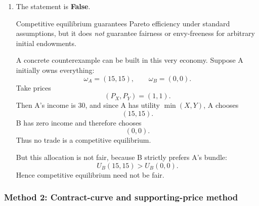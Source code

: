 \documentclass[12pt]{article}
\begin{document}
\begin{enumerate}[label=(\alph*)]
    At A's bundle \((7,7)\), A is exactly at the kink of the Leontief indifference curve \(X_A=Y_A\), so this same price ratio can support A's optimum. Therefore there exists a common supporting price vector, and hence \((7,7)\) is Pareto efficient.

    To produce \((7,7)\) as a competitive equilibrium after trade, choose an initial endowment for A that is different from \((7,7)\) but lies on the same budget line through \((7,7)\) at prices \(\left(\frac23,1\right)\). For example, take
    \[
    \omega_A'=(4,9).
    \]
    Then B's endowment is
    \[
    \omega_B'=(11,6).
    \]
    Check the value of A's endowment:
    \[
    \frac23\cdot 4+9=\frac{35}{3}.
    \]
    The value of A's target bundle \((7,7)\) is
    \[
    \frac23\cdot 7+7=\frac{35}{3}.
    \]
    So A can afford \((7,7)\), and similarly B can afford \((8,8)\). Hence with the endowment profile
    \[
    \omega_A'=(4,9),\qquad \omega_B'=(11,6),
    \]
    the allocation
    \[
    A:(7,7),\qquad B:(8,8)
    \]
    is a competitive equilibrium after trading.
\newpage
    \item
    The statement is \textbf{False}.

    Competitive equilibrium guarantees Pareto efficiency under standard assumptions, but it does \emph{not} guarantee fairness or envy-freeness for arbitrary initial endowments.

    A concrete counterexample can be built in this very economy. Suppose A initially owns everything:
    \[
    \omega_A=(15,15),\qquad \omega_B=(0,0).
    \]
    Take prices
    \[
    (P_X,P_Y)=(1,1).
    \]
    Then A's income is \(30\), and since A has utility \(\min(X,Y)\), A chooses
    \[
    (15,15).
    \]
    B has zero income and therefore chooses
    \[
    (0,0).
    \]
    Thus no trade is a competitive equilibrium.

    But this allocation is not fair, because B strictly prefers A's bundle:
    \[
    U_B(15,15)>U_B(0,0).
    \]
    Hence competitive equilibrium need not be fair.
\end{enumerate}

\newpage
\subsubsection{Method 2: Contract-curve and supporting-price method}
\end{document}
